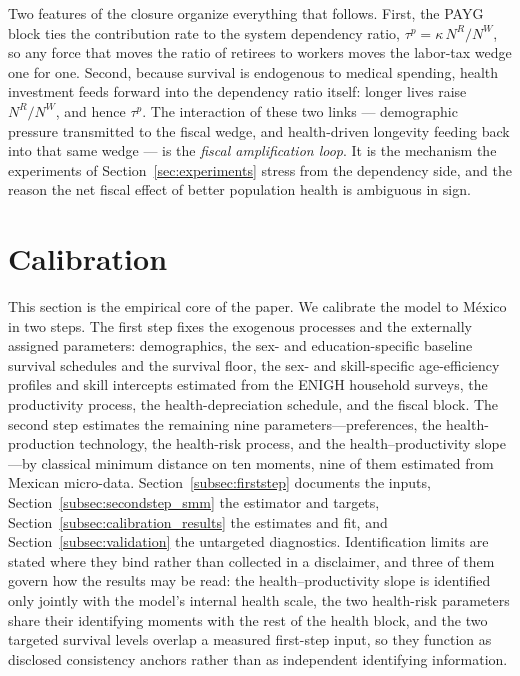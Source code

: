 \documentclass[12pt,a4paper]{article}
\begin{document}
Two features of the closure organize everything that follows. First, the PAYG block ties the contribution rate to the system dependency ratio, $\tau^p = \kappa\,N^R/N^W$, so any force that moves the ratio of retirees to workers moves the labor-tax wedge one for one. Second, because survival is endogenous to medical spending, health investment feeds forward into the dependency ratio itself: longer lives raise $N^R/N^W$, and hence $\tau^p$. The interaction of these two links --- demographic pressure transmitted to the fiscal wedge, and health-driven longevity feeding back into that same wedge --- is the \emph{fiscal amplification loop}. It is the mechanism the experiments of Section~\ref{sec:experiments} stress from the dependency side, and the reason the net fiscal effect of better population health is ambiguous in sign.
\section{Calibration}
\label{sec:calibration}

This section is the empirical core of the paper. We calibrate the model to M\'exico in two steps. The first step fixes the exogenous processes and the externally assigned parameters: demographics, the sex- and education-specific baseline survival schedules and the survival floor, the sex- and skill-specific age-efficiency profiles and skill intercepts estimated from the ENIGH household surveys, the productivity process, the health-depreciation schedule, and the fiscal block. The second step estimates the remaining nine parameters---preferences, the health-production technology, the health-risk process, and the health--productivity slope---by classical minimum distance on ten moments, nine of them estimated from Mexican micro-data. Section~\ref{subsec:firststep} documents the inputs, Section~\ref{subsec:secondstep_smm} the estimator and targets, Section~\ref{subsec:calibration_results} the estimates and fit, and Section~\ref{subsec:validation} the untargeted diagnostics. Identification limits are stated where they bind rather than collected in a disclaimer, and three of them govern how the results may be read: the health--productivity slope is identified only jointly with the model's internal health scale, the two health-risk parameters share their identifying moments with the rest of the health block, and the two targeted survival levels overlap a measured first-step input, so they function as disclosed consistency anchors rather than as independent identifying information.
\end{document}

